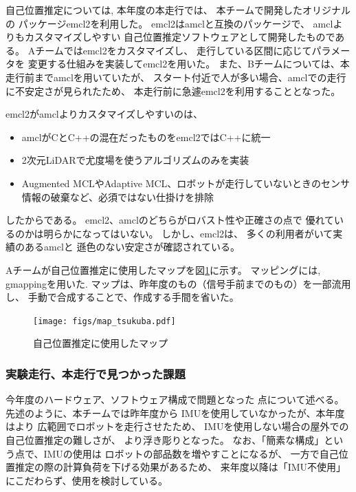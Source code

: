 \documentclass[twocolumn,9pt]{jsproceedings}
\begin{document}
自己位置推定については, 本年度の本走行では、
本チームで開発したオリジナルの
パッケージemcl2\cite{emcl2}を利用した。
emcl2はamcl\cite{amcl}と互換のパッケージで、
amclよりもカスタマイズしやすい
自己位置推定ソフトウェアとして開発したものである。
Aチームではemcl2をカスタマイズし、
走行している区間に応じてパラメータを
変更する仕組みを実装してemcl2を用いた。
また、Bチームについては、本走行前までamclを用いていたが、
スタート付近で人が多い場合、amclでの走行に不安定さが見られたため、
本走行前に急遽emcl2を利用することとなった。


emcl2がamclよりカスタマイズしやすいのは、
\begin{itemize}
	\item amclがCとC++の混在だったものをemcl2ではC++に統一
	\item 2次元LiDARで尤度場を使うアルゴリズムのみを実装
	\item Augmented MCL\cite{gutmann2002}やAdaptive MCL\cite{fox2003}、ロボットが走行していないときのセンサ情報の破棄など、必須ではない仕掛けを排除
\end{itemize}
したからである。
emcl2、amclのどちらがロバスト性や正確さの点で
優れているのかは明らかになってはいない。
しかし、emcl2は、
多くの利用者がいて実績のあるamclと
遜色のない安定さが確認されている。



Aチームが自己位置推定に使用したマップを図\ref{fig:map_tsukuba}に示す。
マッピングには, gmappingを用いた. 
マップは、昨年度のもの（信号手前までのもの）を一部流用し、
手動で合成することで、作成する手間を省いた。



\begin{figure}[h]
  \begin{center}
    \texttt{[image: figs/map\_tsukuba.pdf]}
    \caption{自己位置推定に使用したマップ}
    \label{fig:map_tsukuba}
  \end{center}
\end{figure}

\subsubsection{実験走行、本走行で見つかった課題}

今年度のハードウェア、ソフトウェア構成で問題となった
点について述べる。先述のように、本チームでは昨年度から
IMUを使用していなかったが、本年度はより
広範囲でロボットを走行させたため、
IMUを使用しない場合の屋外での自己位置推定の難しさが、
より浮き彫りとなった。
なお、「簡素な構成」という点で、IMUの使用は
ロボットの部品数を増やすことになるが、
一方で自己位置推定の際の計算負荷を下げる効果があるため、
来年度以降は「IMU不使用」にこだわらず、使用を検討している。
\end{document}
